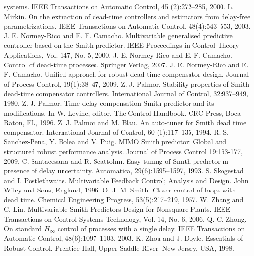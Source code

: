 \documentclass[default]{svmult}
\begin{document}
\begin{thebibliography}{99.}
systems. IEEE Transactions on Automatic Control, 45
(2):272--285, 2000.
%
 L. Mirkin. On the extraction of dead-time controllers
and estimators from delay-free parametrizations. IEEE
Transactions on Automatic Control, 48(4):543--553,
2003.
%
 J. E. Normey-Rico and E. F. Camacho. Multivariable generalised predictive controller based on the Smith predictor. IEEE Proceedings in Control Theory Applications, Vol. 147, No. 5, 2000.
%
 J. E. Normey-Rico and E. F. Camacho. Control of dead-time
processes. Springer Verlag, 2007.
%
 J. E. Normey-Rico and E. F. Camacho. Unified approach
for robust dead-time compensator design. Journal of
Process Control, 19(1):38--47, 2009.
%
 Z. J. Palmor. Stability properties of Smith dead-time compensator
controllers. International Journal of Control,
32:937--949, 1980.
%
 Z. J. Palmor. Time-delay compensation Smith predictor
and its modifications. In W. Levine, editor, The Control
Handbook. CRC Press, Boca Raton, FL, 1996.
%
 Z. J. Palmor and M. Blau. An auto-tuner for Smith dead
time compensator. International Journal of Control, 60
(1):117--135, 1994.
%
 R. S. Sanchez-Pena, Y. Bolea and V. Puig. MIMO Smith predictor: Global and structured robust performance analysis. Journal of Process Control 19:163-177, 2009.
%
 C. Santacesaria and R. Scattolini. Easy tuning of Smith
predictor in presence of delay uncertainty. Automatica,
29(6):1595--1597, 1993.
%
 S. Skogestad and I. Postlethwaite. Multivariable Feedback Control; Analysis and Design. John Wiley and Sons, England, 1996.
%
 O. J. M. Smith. Closer control of loops with dead time.
Chemical Engineering Progress, 53(5):217--219, 1957.
%
 W. Zhang and C. Lin. Multivariable Smith Predictors Design for Nonsquare Plants. IEEE Transactions on Control Systems Technology,
Vol. 14, No. 6, 2006.
%
 Q. C. Zhong. On standard $H_\infty$ control of processes with a single delay. IEEE Transactions on Automatic Control,
48(6):1097--1103, 2003.
%
 K. Zhou and J. Doyle. Essentials of Robust Control. Prentice-Hall, Upper Saddle River, New Jersey, USA, 1998.
%
\bigskip
\end{thebibliography}
\end{document}
